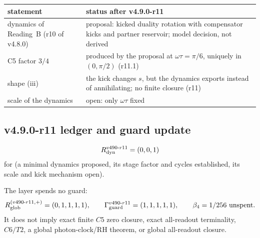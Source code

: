 \begin{center}
\small
\begin{tabular}{@{}>{\raggedright\arraybackslash}p{}>{\raggedright\arraybackslash}p{}@{}}
\toprule
statement & status after v4.9.0-r11\\
\midrule
dynamics of Reading~B (r10 of v4.8.0) & proposal: kicked duality rotation with compensator kicks and partner reservoir; model decision, not derived\\
C5 factor \(3/4\) & produced by the proposal at \(\omega\tau=\pi/6\), uniquely in \((0,\pi/2)\) (r11.1)\\
shape (iii) & the kick changes \(s\), but the dynamics exports instead of annihilating; no finite closure (r11)\\
scale of the dynamics & open: only \(\omega\tau\) fixed\\
\bottomrule
\end{tabular}
\end{center}

\subsection*{v4.9.0-r11 ledger and guard update}
\label{subsec:v490-r11-ledger-guard}

\[
R_{\rm dyn}^{v490\text{-}r11}=(0,0,1)
\]
for (a minimal dynamics proposed, its stage factor and cycles established, its scale and kick mechanism open).

The layer spends no guard:
\[
R_{\rm glob}^{(v490\text{-}r11,+)}=(0,1,1,1,1),
\qquad
\Gamma_{\rm guard}^{v490\text{-}r11}=(1,1,1,1,1),
\qquad
\beta_4=1/256\ \text{unspent}.
\]
It does not imply exact finite \(C5\) zero closure, exact all-readout terminality,
\(C6/T2\), a global photon-clock/RH theorem, or global all-readout closure.

